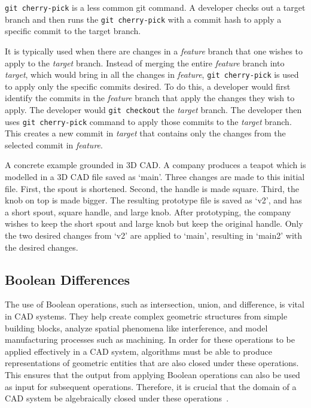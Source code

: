 \documentclass[sigconf,authorversion,nonacm]{acmart}
\begin{document}
\texttt{git cherry-pick} is a less common git command.
A developer checks out a target branch and then runs the \texttt{git cherry-pick} with a commit hash to apply a specific commit to the target branch.

It is typically used when there are changes in a \emph{feature} branch that one wishes to apply to the \emph{target} branch.
Instead of merging the entire \emph{feature} branch into \emph{target}, which would bring in all the changes in \emph{feature}, \texttt{git cherry-pick} is used to apply only the specific commits desired.
To do this, a developer would first identify the commits in the \emph{feature} branch that apply the changes they wish to apply.
The developer would \texttt{git checkout} the \emph{target} branch.
The developer then uses \texttt{git cherry-pick} command to apply those commits to the \emph{target} branch.
This creates a new commit in \emph{target} that contains only the changes from the selected commit in \emph{feature}.

A concrete example grounded in 3D CAD.
A company produces a teapot which is modelled in a 3D CAD file saved as `main'.
Three changes are made to this initial file.
First, the spout is shortened.
Second, the handle is made square.
Third, the knob on top is made bigger.
The resulting prototype file is saved as `v2', and has a short spout, square handle, and large knob.
After prototyping, the company wishes to keep the short spout and large knob but keep the original handle.
Only the two desired changes from `v2' are applied to `main', resulting in `main2' with the desired changes.

\subsection{Boolean Differences}

The use of Boolean operations, such as intersection, union, and difference, is vital in CAD systems.
They help create complex geometric structures from simple building blocks, analyze spatial phenomena like interference, and model manufacturing processes such as machining.
In order for these operations to be applied effectively in a CAD system, algorithms must be able to produce representations of geometric entities that are also closed under these operations.
This ensures that the output from applying Boolean operations can also be used as input for subsequent operations.
Therefore, it is crucial that the domain of a CAD system be algebraically closed under these operations~\cite{tilove1980closure}.
\end{document}
